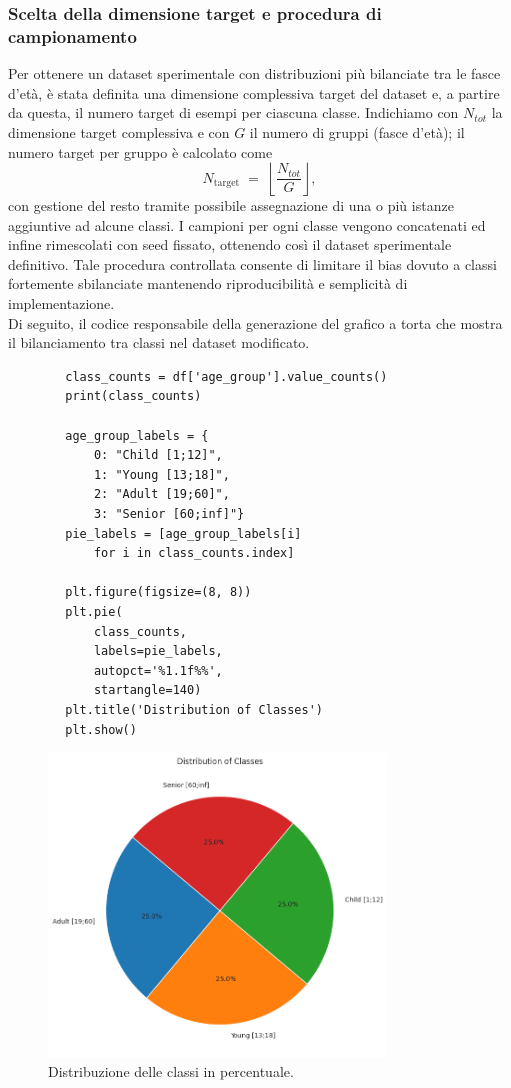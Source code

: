 \documentclass[a4paper,12pt]{report}
\begin{document}
	\subsubsection{Scelta della dimensione target e procedura di campionamento}
	Per ottenere un dataset sperimentale con distribuzioni più bilanciate tra le fasce d'età, è stata definita una dimensione complessiva target del dataset e, a partire da questa, il numero target di esempi per ciascuna classe. Indichiamo con \(N_{tot}\) la dimensione target complessiva e con \(G\) il numero di gruppi (fasce d'età); il numero target per gruppo è calcolato come
	\[
	N_{\text{target}} \;=\; \left\lfloor \frac{N_{tot}}{G} \right\rfloor,
	\]
	con gestione del resto tramite possibile assegnazione di una o più istanze aggiuntive ad alcune classi. I campioni per ogni classe vengono concatenati ed infine rimescolati con seed fissato, ottenendo così il dataset sperimentale definitivo. Tale procedura controllata consente di limitare il bias dovuto a classi fortemente sbilanciate mantenendo riproducibilità e semplicità di implementazione. \\
	Di seguito, il codice responsabile della generazione del grafico a torta che mostra il bilanciamento tra classi nel dataset modificato.
	\begin{verbatim}
		class_counts = df['age_group'].value_counts()
		print(class_counts)
		
		age_group_labels = {
			0: "Child [1;12]", 
			1: "Young [13;18]", 
			2: "Adult [19;60]", 
			3: "Senior [60;inf]"}
		pie_labels = [age_group_labels[i] 
			for i in class_counts.index]
		
		plt.figure(figsize=(8, 8))
		plt.pie(
			class_counts, 
			labels=pie_labels, 
			autopct='%1.1f%%', 
			startangle=140)
		plt.title('Distribution of Classes')
		plt.show()
	\end{verbatim}
	
	\begin{figure}[H]
		\centering
		\includegraphics[width=0.8\textwidth]{img/pie_agegroup_image.png}
		\caption{Distribuzione delle classi in percentuale.}
	\end{figure}
	
\end{document}
